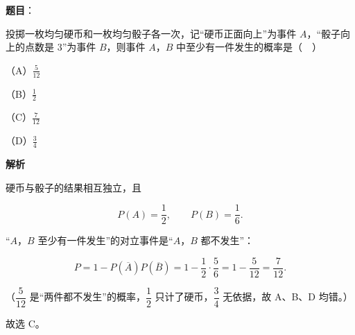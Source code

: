 \begin{answer}

\textbf{题目}：

投掷一枚均匀硬币和一枚均匀骰子各一次，记“硬币正面向上”为事件 $A$，“骰子向上的点数是 $3$”为事件 $B$，则事件 $A$，$B$ 中至少有一件发生的概率是（　）

（A）$\frac{5}{12}$

（B）$\frac12$

（C）$\frac{7}{12}$

（D）$\frac34$

\textbf{解析}

硬币与骰子的结果相互独立，且

\nopagebreak[4]
\[P(A)=\frac12,\qquad P(B)=\frac16.\]

“$A$，$B$ 至少有一件发生”的对立事件是“$A$，$B$ 都不发生”：

\nopagebreak[4]
\[P=1-P(\overline A)P(\overline B)=1-\frac12\cdot\frac56=1-\frac5{12}=\frac7{12}.\]

（$\dfrac{5}{12}$ 是“两件都不发生”的概率，$\dfrac12$ 只计了硬币，$\dfrac34$ 无依据，故 A、B、D 均错。）

故选 C。


\end{answer}
